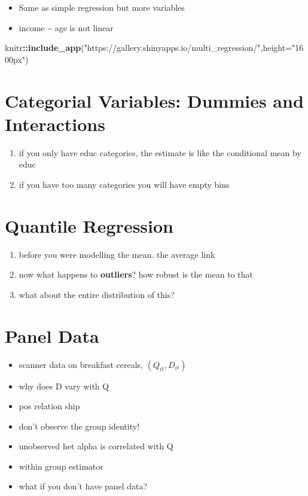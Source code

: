 \documentclass[]{book}
\newenvironment{Shaded}{\begin{snugshade}}{\end{snugshade}}
\newcommand{\KeywordTok}[1]{\textcolor[rgb]{0.13,0.29,0.53}{\textbf{#1}}}
\newcommand{\DataTypeTok}[1]{\textcolor[rgb]{0.13,0.29,0.53}{#1}}
\newcommand{\StringTok}[1]{\textcolor[rgb]{0.31,0.60,0.02}{#1}}
\newcommand{\OperatorTok}[1]{\textcolor[rgb]{0.81,0.36,0.00}{\textbf{#1}}}
\newcommand{\NormalTok}[1]{#1}
\providecommand{\tightlist}{%
  \setlength{\itemsep}{0pt}\setlength{\parskip}{0pt}}
\theoremstyle{definition}
\theoremstyle{definition}
\theoremstyle{definition}
\theoremstyle{remark}
\begin{document}
\begin{itemize}
\tightlist
\item
  Same as simple regression but more variables
\item
  income \textasciitilde{} age is not linear
\end{itemize}

\begin{Shaded}
\begin{Highlighting}[]
\NormalTok{knitr}\OperatorTok{::}\KeywordTok{include_app}\NormalTok{(}\StringTok{"https://gallery.shinyapps.io/multi_regression/"}\NormalTok{,}\DataTypeTok{height=}\StringTok{"1600px"}\NormalTok{)}
\end{Highlighting}
\end{Shaded}

\chapter{Categorial Variables: Dummies and
Interactions}\label{categorical-vars}

\begin{enumerate}
\def\labelenumi{\arabic{enumi}.}
\tightlist
\item
  if you only have educ categories, the estimate is like the conditional
  mean by educ
\item
  if you have too many categories you will have empty bins
\end{enumerate}

\chapter{Quantile Regression}\label{quantreg}

\begin{enumerate}
\def\labelenumi{\arabic{enumi}.}
\tightlist
\item
  before you were modelling the mean. the average link
\item
  now what happens to \textbf{outliers}? how robust is the mean to that
\item
  what about the entire distribution of this?
\end{enumerate}

\chapter{Panel Data}\label{panel-data}

\begin{itemize}
\tightlist
\item
  scanner data on breakfast cereals, \((Q_{it},D_{it})\)
\item
  why does D vary with Q
\item
  pos relation ship
\item
  don't observe the group identity!
\item
  unobserved het alpha is correlated with Q
\item
  within group estimator
\item
  what if you don't have panel data?
\end{itemize}
\end{document}
